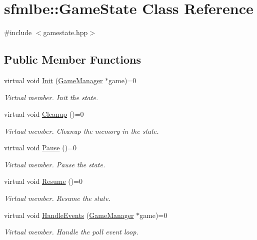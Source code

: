 \hypertarget{classsfmlbe_1_1_game_state}{}\section{sfmlbe\+:\+:Game\+State Class Reference}
\label{classsfmlbe_1_1_game_state}


{\ttfamily \#include $<$gamestate.\+hpp$>$}

\subsection*{Public Member Functions}
\begin{DoxyCompactItemize}
\item 
virtual void \mbox{\hyperlink{classsfmlbe_1_1_game_state_acd3f110b2da9986bfe3c5981422457dc}{Init}} (\mbox{\hyperlink{classsfmlbe_1_1_game_manager}{Game\+Manager}} $\ast$game)=0
\begin{DoxyCompactList}\small\item\em Virtual member. Init the state. \end{DoxyCompactList}\item 
virtual void \mbox{\hyperlink{classsfmlbe_1_1_game_state_ab8f53722c3d8c87d9ca3826b89f1da9b}{Cleanup}} ()=0
\begin{DoxyCompactList}\small\item\em Virtual member. Cleanup the memory in the state. \end{DoxyCompactList}\item 
virtual void \mbox{\hyperlink{classsfmlbe_1_1_game_state_a5a91935e9a6e04754373fb36d08e8358}{Pause}} ()=0
\begin{DoxyCompactList}\small\item\em Virtual member. Pause the state. \end{DoxyCompactList}\item 
virtual void \mbox{\hyperlink{classsfmlbe_1_1_game_state_ac45b1eba2aef82a0b15ab147da668b34}{Resume}} ()=0
\begin{DoxyCompactList}\small\item\em Virtual member. Resume the state. \end{DoxyCompactList}\item 
virtual void \mbox{\hyperlink{classsfmlbe_1_1_game_state_a44242b884396f04b6832436eb4325f05}{Handle\+Events}} (\mbox{\hyperlink{classsfmlbe_1_1_game_manager}{Game\+Manager}} $\ast$game)=0
\begin{DoxyCompactList}\small\item\em Virtual member. Handle the poll event loop. \end{DoxyCompactList}\item 

\end{DoxyCompactItemize}

